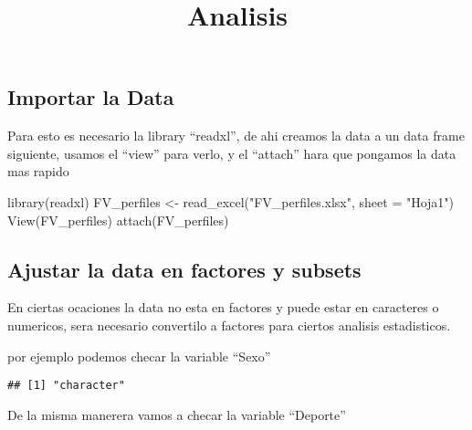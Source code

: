 \documentclass[
]{article}
\title{Analisis}
\author{}
\date{\vspace{-2.5em}}
\newenvironment{Shaded}{\begin{snugshade}}{\end{snugshade}}
\newcommand{\AttributeTok}[1]{\textcolor[rgb]{0.77,0.63,0.00}{#1}}
\newcommand{\FunctionTok}[1]{\textcolor[rgb]{0.00,0.00,0.00}{#1}}
\newcommand{\NormalTok}[1]{#1}
\newcommand{\OtherTok}[1]{\textcolor[rgb]{0.56,0.35,0.01}{#1}}
\newcommand{\SpecialCharTok}[1]{\textcolor[rgb]{0.00,0.00,0.00}{#1}}
\newcommand{\StringTok}[1]{\textcolor[rgb]{0.31,0.60,0.02}{#1}}
\begin{document}
\maketitle

\hypertarget{importar-la-data}{%
\subsection{Importar la Data}\label{importar-la-data}}

Para esto es necesario la library ``readxl'', de ahi creamos la data a
un data frame siguiente, usamos el ``view'' para verlo, y el ``attach''
hara que pongamos la data mas rapido

\begin{Shaded}
\begin{Highlighting}[]
\FunctionTok{library}\NormalTok{(readxl)}
\NormalTok{FV\_perfiles }\OtherTok{\textless{}{-}} \FunctionTok{read\_excel}\NormalTok{(}\StringTok{"FV\_perfiles.xlsx"}\NormalTok{, }
                          \AttributeTok{sheet =} \StringTok{"Hoja1"}\NormalTok{)}
\FunctionTok{View}\NormalTok{(FV\_perfiles)}
\FunctionTok{attach}\NormalTok{(FV\_perfiles)}
\end{Highlighting}
\end{Shaded}

\hypertarget{ajustar-la-data-en-factores-y-subsets}{%
\subsection{Ajustar la data en factores y
subsets}\label{ajustar-la-data-en-factores-y-subsets}}

En ciertas ocaciones la data no esta en factores y puede estar en
caracteres o numericos, sera necesario convertilo a factores para
ciertos analisis estadisticos.

por ejemplo podemos checar la variable ``Sexo''

\begin{Shaded}
\end{Shaded}

\begin{verbatim}
## [1] "character"
\end{verbatim}

De la misma manerera vamos a checar la variable ``Deporte''
\end{document}
